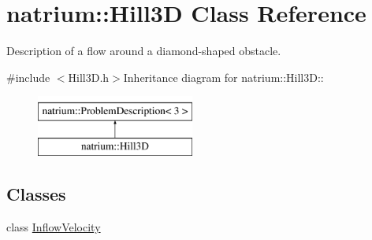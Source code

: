 \hypertarget{classnatrium_1_1Hill3D}{
\section{natrium::Hill3D Class Reference}
\label{classnatrium_1_1Hill3D}
}


Description of a flow around a diamond-\/shaped obstacle.  


{\ttfamily \#include $<$Hill3D.h$>$}Inheritance diagram for natrium::Hill3D::\begin{figure}[H]
\begin{center}
\leavevmode
\includegraphics[height=2cm]{classnatrium_1_1Hill3D}
\end{center}
\end{figure}
\subsection*{Classes}
\begin{DoxyCompactItemize}
\item 
class \hyperlink{classnatrium_1_1Hill3D_1_1InflowVelocity}{InflowVelocity}
\end{DoxyCompactItemize}
